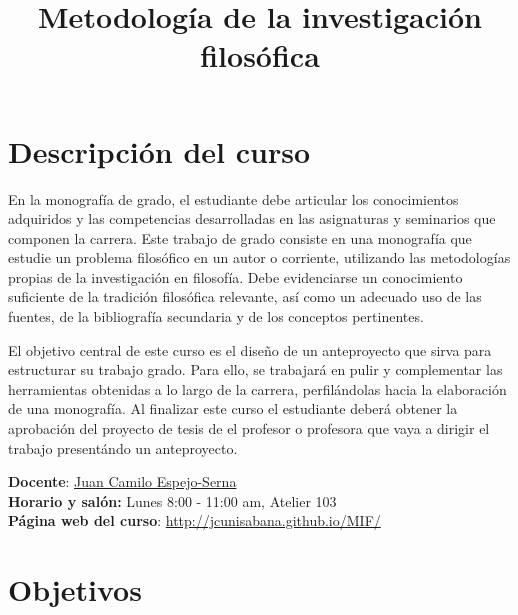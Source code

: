 \documentclass[]{article}
\title{Metodología de la investigación filosófica}
\author{}
\date{}
\begin{document}
\maketitle

\section{Descripción del curso}\label{descripcion-del-curso}

En la monografía de grado, el estudiante debe articular los
conocimientos adquiridos y las competencias desarrolladas en las
asignaturas y seminarios que componen la carrera. Este trabajo de grado
consiste en una monografía que estudie un problema filosófico en un
autor o corriente, utilizando las metodologías propias de la
investigación en filosofía. Debe evidenciarse un conocimiento suficiente
de la tradición filosófica relevante, así como un adecuado uso de las
fuentes, de la bibliografía secundaria y de los conceptos pertinentes.

El objetivo central de este curso es el diseño de un anteproyecto que
sirva para estructurar su trabajo grado. Para ello, se trabajará en
pulir y complementar las herramientas obtenidas a lo largo de la
carrera, perfilándolas hacia la elaboración de una monografía. Al
finalizar este curso el estudiante deberá obtener la aprobación del
proyecto de tesis de el profesor o profesora que vaya a dirigir el
trabajo presentándo un anteproyecto.

\textbf{Docente}: \href{../index.html}{Juan Camilo Espejo-Serna}\\
\textbf{Horario y salón:} Lunes 8:00 - 11:00 am, Atelier 103\\
\textbf{Página web del curso}: \url{http://jcunisabana.github.io/MIF/}

\section{Objetivos}\label{objetivos}
\end{document}
